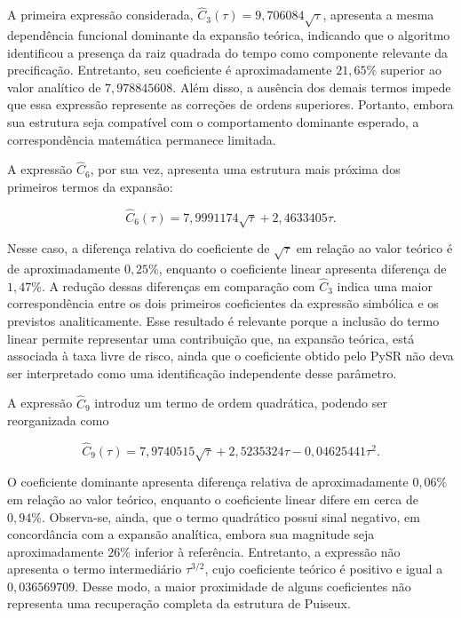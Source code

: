 A primeira expressão considerada, $\widehat{C}_3(\tau)=9{,}706084\sqrt{\tau}$, apresenta a mesma dependência funcional dominante da expansão teórica, indicando que o algoritmo identificou a presença da raiz quadrada do tempo como componente relevante da precificação. Entretanto, seu coeficiente é aproximadamente $21{,}65\%$ superior ao valor analítico de $7{,}978845608$. Além disso, a ausência dos demais termos impede que essa expressão represente as correções de ordens superiores. Portanto, embora sua estrutura seja compatível com o comportamento dominante esperado, a correspondência matemática permanece limitada.

A expressão $\widehat{C}_6$, por sua vez, apresenta uma estrutura mais próxima dos primeiros termos da expansão:

\begin{equation}
\widehat{C}_6(\tau)=
7{,}9991174\sqrt{\tau}
+2{,}4633405\tau.
\end{equation}

Nesse caso, a diferença relativa do coeficiente de $\sqrt{\tau}$ em relação ao valor teórico é de aproximadamente $0{,}25\%$, enquanto o coeficiente linear apresenta diferença de $1{,}47\%$. A redução dessas diferenças em comparação com $\widehat{C}_3$ indica uma maior correspondência entre os dois primeiros coeficientes da expressão simbólica e os previstos analiticamente. Esse resultado é relevante porque a inclusão do termo linear permite representar uma contribuição que, na expansão teórica, está associada à taxa livre de risco, ainda que o coeficiente obtido pelo PySR não deva ser interpretado como uma identificação independente desse parâmetro.

A expressão $\widehat{C}_9$ introduz um termo de ordem quadrática, podendo ser reorganizada como

\begin{equation}
\widehat{C}_9(\tau)=
7{,}9740515\sqrt{\tau}
+2{,}5235324\tau
-0{,}04625441\tau^2.
\end{equation}

O coeficiente dominante apresenta diferença relativa de aproximadamente $0{,}06\%$ em relação ao valor teórico, enquanto o coeficiente linear difere em cerca de $0{,}94\%$. Observa-se, ainda, que o termo quadrático possui sinal negativo, em concordância com a expansão analítica, embora sua magnitude seja aproximadamente $26\%$ inferior à referência. Entretanto, a expressão não apresenta o termo intermediário $\tau^{3/2}$, cujo coeficiente teórico é positivo e igual a $0{,}036569709$. Desse modo, a maior proximidade de alguns coeficientes não representa uma recuperação completa da estrutura de Puiseux.


